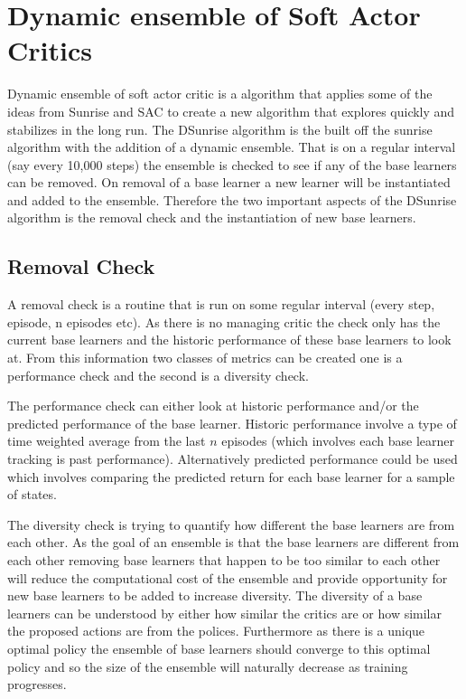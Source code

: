 \chapter{Dynamic ensemble of Soft Actor Critics}

Dynamic ensemble of soft actor critic is a algorithm that applies some of the ideas from Sunrise \cite{leeSUNRISESimpleUnified2021} and SAC \cite{haarnojaSoftActorCriticAlgorithms2019} to create a new algorithm that explores quickly and stabilizes in the long run. The DSunrise algorithm is the built off the sunrise algorithm with the addition of a dynamic ensemble. That is on a regular interval (say every 10,000 steps) the ensemble is checked to see if any of the base learners can be removed. On removal of a base learner a new learner will be instantiated and added to the ensemble. Therefore the two important aspects of the DSunrise algorithm is the removal check and the instantiation of new base learners.

\section{Removal Check}

A removal check is a routine that is run on some regular interval (every step, episode, n episodes etc). As there is no managing critic the check only has the current base learners and the historic performance of these base learners to look at. From this information two classes of metrics can be created one is a performance check and the second is a diversity check.

The performance check can either look at historic performance and/or the predicted performance of the base learner. Historic performance involve a type of time weighted average from the last $n$ episodes (which involves each base learner tracking is past performance). Alternatively predicted performance could be used which involves comparing the predicted return for each base learner for a sample of states.

The diversity check is trying to quantify how different the base learners are from each other. As the goal of an ensemble is that the base learners are different from each other removing base learners that happen to be too similar to each other will reduce the computational cost of the ensemble and provide opportunity for new base learners to be added to increase diversity. The diversity of a base learners can be understood by either how similar the critics are or how similar the proposed actions are from the polices. Furthermore as there is a unique optimal policy the ensemble of base learners should converge to this optimal policy and so the size of the ensemble will naturally decrease as training progresses.

